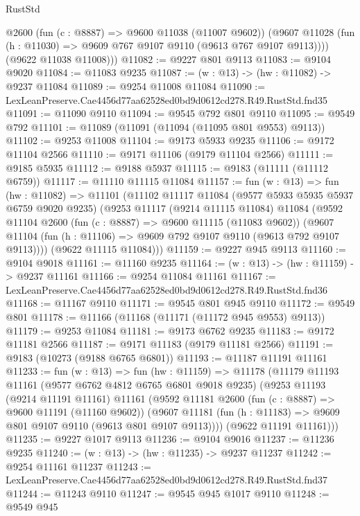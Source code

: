 \begin{lexlean}{RustStd}
\begin{coremodule}
          @2600
          (fun (c : @8887) => @9600 @11038 (@11007 @9602))
          (@9607 @11028 (fun (h : @11030) => @9609 @767 @9107 @9110 (@9613 @767 @9107 @9113))))
        (@9622 @11038 @11008)))
@11082 := @9227 @801 @9113
@11083 := @9104 @9020
@11084 := @11083 @9235
@11087 := (w : @13) -> (hw : @11082) -> @9237 @11084
@11089 := @9254 @11008 @11084
@11090 := LexLeanPreserve.Cae4456d77aa62528ed0bd9d0612cd278.R49.RustStd.fnd35
@11091 := @11090 @9110
@11094 := @9545 @792 @801 @9110
@11095 := @9549 @792
@11101 := @11089 (@11091 (@11094 (@11095 @801 @9553) @9113))
@11102 := @9253 @11008
@11104 := @9173 @5933 @9235
@11106 := @9172 @11104 @2566
@11110 := @9171 @11106 (@9179 @11104 @2566)
@11111 := @9185 @5935
@11112 := @9188 @5937
@11115 := @9183 (@11111 (@11112 @6759))
@11117 := @11110 @11115 @11084
@11157 := fun (w : @13) =>
  fun (hw : @11082) =>
  @11101
    (@11102
      @11117
      @11084
      (@9577 @5933 @5935 @5937 @6759 @9020 @9235)
      (@9253
        @11117
        (@9214 @11115 @11084)
        @11084
        (@9592
          @11104
          @2600
          (fun (c : @8887) => @9600 @11115 (@11083 @9602))
          (@9607 @11104 (fun (h : @11106) => @9609 @792 @9107 @9110 (@9613 @792 @9107 @9113))))
        (@9622 @11115 @11084)))
@11159 := @9227 @945 @9113
@11160 := @9104 @9018
@11161 := @11160 @9235
@11164 := (w : @13) -> (hw : @11159) -> @9237 @11161
@11166 := @9254 @11084 @11161
@11167 := LexLeanPreserve.Cae4456d77aa62528ed0bd9d0612cd278.R49.RustStd.fnd36
@11168 := @11167 @9110
@11171 := @9545 @801 @945 @9110
@11172 := @9549 @801
@11178 := @11166 (@11168 (@11171 (@11172 @945 @9553) @9113))
@11179 := @9253 @11084
@11181 := @9173 @6762 @9235
@11183 := @9172 @11181 @2566
@11187 := @9171 @11183 (@9179 @11181 @2566)
@11191 := @9183 (@10273 (@9188 @6765 @6801))
@11193 := @11187 @11191 @11161
@11233 := fun (w : @13) =>
  fun (hw : @11159) =>
  @11178
    (@11179
      @11193
      @11161
      (@9577 @6762 @4812 @6765 @6801 @9018 @9235)
      (@9253
        @11193
        (@9214 @11191 @11161)
        @11161
        (@9592
          @11181
          @2600
          (fun (c : @8887) => @9600 @11191 (@11160 @9602))
          (@9607 @11181 (fun (h : @11183) => @9609 @801 @9107 @9110 (@9613 @801 @9107 @9113))))
        (@9622 @11191 @11161)))
@11235 := @9227 @1017 @9113
@11236 := @9104 @9016
@11237 := @11236 @9235
@11240 := (w : @13) -> (hw : @11235) -> @9237 @11237
@11242 := @9254 @11161 @11237
@11243 := LexLeanPreserve.Cae4456d77aa62528ed0bd9d0612cd278.R49.RustStd.fnd37
@11244 := @11243 @9110
@11247 := @9545 @945 @1017 @9110
@11248 := @9549 @945

\end{coremodule}
\end{lexlean}

